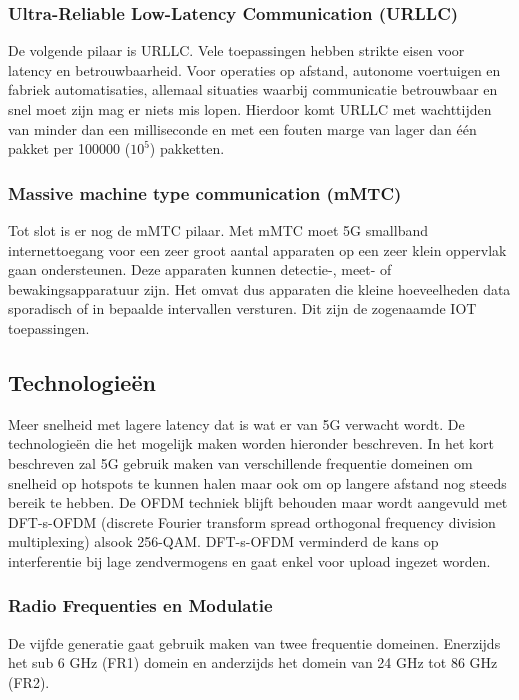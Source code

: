 \documentclass{article}
\begin{document}
\subsubsection{Ultra-Reliable Low-Latency Communication (URLLC)}
De volgende pilaar is URLLC. Vele toepassingen hebben strikte eisen voor latency en betrouwbaarheid. Voor operaties op afstand, autonome voertuigen en fabriek automatisaties, allemaal situaties waarbij communicatie betrouwbaar en snel moet zijn mag er niets mis lopen. Hierdoor komt URLLC met wachttijden van minder dan een milliseconde en met een fouten marge van lager dan één pakket per 100000 ($10^5$) pakketten. \cite{spec} \cite{urllc} \cite{5gc}

\subsubsection{Massive machine type communication (mMTC)}
Tot slot is er nog de mMTC pilaar. Met mMTC moet 5G smallband internettoegang voor een zeer groot aantal apparaten op een zeer klein oppervlak gaan ondersteunen. Deze apparaten kunnen detectie-, meet- of bewakingsapparatuur zijn. Het omvat dus apparaten die kleine hoeveelheden data sporadisch of in bepaalde intervallen versturen. Dit zijn de zogenaamde IOT toepassingen. \cite{spec} \cite{urllc} \cite{5gc}


\subsection{Technologieën}
Meer snelheid met lagere latency dat is wat er van 5G verwacht wordt. De technologieën die het mogelijk maken worden hieronder beschreven. In het kort beschreven zal 5G gebruik maken van verschillende frequentie domeinen om snelheid op hotspots te kunnen halen maar ook om op langere afstand nog steeds bereik te hebben. De OFDM techniek blijft behouden maar wordt aangevuld met DFT-s-OFDM (discrete Fourier transform spread orthogonal frequency division multiplexing) alsook 256-QAM. DFT-s-OFDM verminderd de kans op interferentie bij lage zendvermogens en gaat enkel voor upload ingezet worden.

\subsubsection{Radio Frequenties en Modulatie}
De vijfde generatie gaat gebruik maken van twee frequentie domeinen. Enerzijds het sub 6 GHz (FR1) domein en anderzijds het domein van 24 GHz tot 86 GHz (FR2). \cite{5gband} \\
\end{document}
